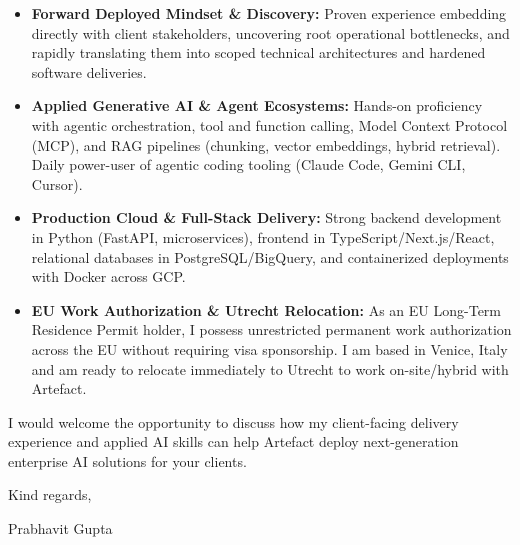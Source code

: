 \documentclass[11pt,a4paper]{article}
\begin{document}
\begin{itemize}[leftmargin=*]
    \item \textbf{Forward Deployed Mindset \& Discovery:} Proven experience embedding directly with client stakeholders, uncovering root operational bottlenecks, and rapidly translating them into scoped technical architectures and hardened software deliveries.
    \item \textbf{Applied Generative AI \& Agent Ecosystems:} Hands-on proficiency with agentic orchestration, tool and function calling, Model Context Protocol (MCP), and RAG pipelines (chunking, vector embeddings, hybrid retrieval). Daily power-user of agentic coding tooling (Claude Code, Gemini CLI, Cursor).
    \item \textbf{Production Cloud \& Full-Stack Delivery:} Strong backend development in Python (FastAPI, microservices), frontend in TypeScript/Next.js/React, relational databases in PostgreSQL/BigQuery, and containerized deployments with Docker across GCP.
    \item \textbf{EU Work Authorization \& Utrecht Relocation:} As an EU Long-Term Residence Permit holder, I possess unrestricted permanent work authorization across the EU without requiring visa sponsorship. I am based in Venice, Italy and am ready to relocate immediately to Utrecht to work on-site/hybrid with Artefact.
\end{itemize}

\noindent I would welcome the opportunity to discuss how my client-facing delivery experience and applied AI skills can help Artefact deploy next-generation enterprise AI solutions for your clients.

\vspace{8pt}

\noindent Kind regards,

\vspace{8pt}

\noindent Prabhavit Gupta
\end{document}
